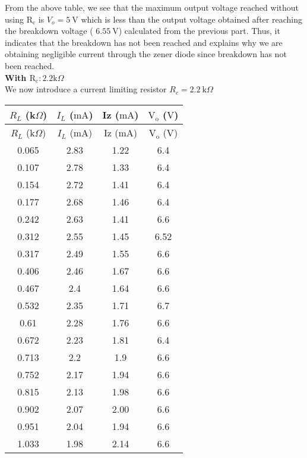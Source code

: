 \documentclass{scrartcl}
\begin{document}
\noindent
From the above table, we see that the maximum output voltage reached without using $\mathrm{R_c}$ is $V_o = 5 \ \mathrm{V}$ which is less than the output voltage obtained after reaching the breakdown voltage ( $6.55\ \mathrm{V}$) calculated from the previous part. Thus, it indicates that the breakdown has not been reached and explains why we are obtaining negligible current through the zener diode since breakdown has not been reached. \\[0.3cm]
\textbf{With $\mathrm{R_c}: 2.2 \mathrm{k}\Omega$ }\\[0.3cm]
We now introduce a current limiting resistor $R_c = 2.2 \ \mathrm{k}\Omega$

\begin{longtable}{|c|c|c|c|} 
        \hline
        $R_L$ (k$\Omega$) & {$I_L$ ($\mathrm{mA}$)} & {Iz ($\mathrm{mA}$)} & {$\mathrm{V_o}$ ($\mathrm{V}$)} \\ \hline
        \endfirsthead
        \hline 
        {$R_L$ (k$\Omega$)} & {$I_L$ ($\mathrm{mA}$)} & {Iz ($\mathrm{mA}$)} & {$\mathrm{V_o}$ ($\mathrm{V}$)} \\ \hline
        \endhead
        
        \hline
        \endfoot
        
        \hline
        \endlastfoot
        
        0.065       & 2.83      & 1.22    & 6.4     \\ \hline
        0.107       & 2.78      & 1.33    & 6.4     \\ \hline
        0.154       & 2.72      & 1.41    & 6.4     \\ \hline
        0.177       & 2.68      & 1.46    & 6.4     \\ \hline
        0.242       & 2.63      & 1.41    & 6.6     \\ \hline
        0.312       & 2.55      & 1.45    & 6.52    \\ \hline
        0.317       & 2.49      & 1.55    & 6.6     \\ \hline
        0.406       & 2.46      & 1.67    & 6.6     \\ \hline
        0.467       & 2.4       & 1.64    & 6.6     \\ \hline
        0.532       & 2.35      & 1.71    & 6.7     \\ \hline
        0.61        & 2.28      & 1.76    & 6.6     \\ \hline
        0.672       & 2.23      & 1.81    & 6.4     \\ \hline
        0.713       & 2.2       & 1.9     & 6.6     \\ \hline
        0.752       & 2.17      & 1.94    & 6.6     \\ \hline
        0.815       & 2.13      & 1.98    & 6.6     \\ \hline
        0.902       & 2.07      & 2.00       & 6.6     \\ \hline
        0.951       & 2.04      & 1.94    & 6.6     \\ \hline
        1.033       & 1.98      & 2.14    & 6.6     \\ \hline
        
        \end{longtable}
\end{document}
